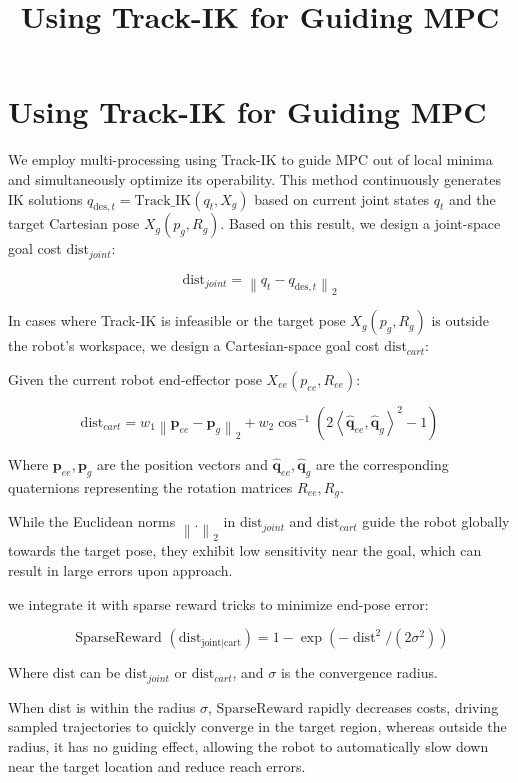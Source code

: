 \documentclass{article}
\begin{document}
	\title{Using Track-IK for Guiding MPC}
	\maketitle
	
\section{Using Track-IK for Guiding MPC}

We employ multi-processing using Track-IK to guide MPC out of local minima and simultaneously optimize its operability. This method continuously generates IK solutions $q_{\text{des},t} = \text{Track\_IK}(q_t,X_g)$ based on current joint states $q_t$ and the target Cartesian pose $X_g(p_g,R_g)$. Based on this result, we design a joint-space goal cost $\text{dist}_{joint}$:

\[\text{dist}_{joint} = \left\|q_t - q_{\mathrm{des},t}\right\|_{2} \tag{1}\]

In cases where Track-IK is infeasible or the target pose $X_g(p_g,R_g)$ is outside the robot's workspace, we design a Cartesian-space goal cost $\text{dist}_{cart}$:

Given the current robot end-effector pose $X_{ee}(p_{ee},R_{ee})$:

\[\text{dist}_{cart} = w_1\left\|\mathbf{p}_{ee}-\mathbf{p}_{g}\right\|_{2} + w_2 \cos^{-1}\left(2\left\langle\hat{\mathbf{q}}_{ee}, \hat{\mathbf{q}}_{g}\right\rangle^{2}-1\right) \tag{2}\]

Where $\mathbf{p}_{ee}, \mathbf{p}_{g}$ are the position vectors and $\hat{\mathbf{q}}_{ee}, \hat{\mathbf{q}}_{g}$ are the corresponding quaternions representing the rotation matrices $R_{ee}, R_g$.

While the Euclidean norms $\left\|.\right\|_{2}$ in $\text{dist}_{joint}$ and $\text{dist}_{cart}$ guide the robot globally towards the target pose, they exhibit low sensitivity near the goal, which can result in large errors upon approach.

we integrate it with sparse reward tricks to minimize end-pose error:

\[\text { SparseReward }(\operatorname{dist_{joint|cart}})=1-\exp \left(-\operatorname{dist}^{2} /\left(2 \sigma^{2}\right)\right)   \tag{3}\]

Where $\text{dist}$ can be $\text{dist}_{joint}$ or $\text{dist}_{cart}$, and $\sigma$ is the convergence radius.

When dist is within the radius $\sigma$, $\text{SparseReward}$ rapidly decreases costs, driving sampled trajectories to quickly converge in the target region, whereas outside the radius, it has no guiding effect, allowing the robot to automatically slow down near the target location and reduce reach errors.
\end{document}
